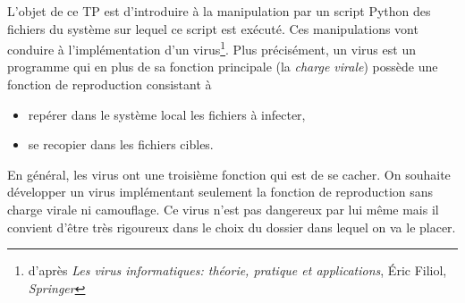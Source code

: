 L'objet de ce TP est d'introduire à la manipulation par un script Python des fichiers du système sur lequel ce script est exécuté. Ces manipulations vont conduire à l'implémentation d'un virus\footnote{d'après \emph{Les virus informatiques: théorie, pratique et applications}, \'Eric Filiol, \emph{Springer}}. Plus précisément, un virus est un programme qui en plus de sa fonction principale (la \emph{charge virale}) possède une fonction de reproduction consistant à
\begin{itemize}
  \item repérer dans le système local les fichiers à infecter,
  \item se recopier dans les fichiers cibles.
\end{itemize}
En général, les virus ont une troisième fonction qui est de \og se cacher\fg.\newline
On souhaite développer un virus implémentant seulement la fonction de reproduction sans charge virale ni camouflage.\newline
Ce virus n'est pas dangereux par lui même mais il convient d'être très rigoureux dans le choix du dossier dans lequel on va le placer.

